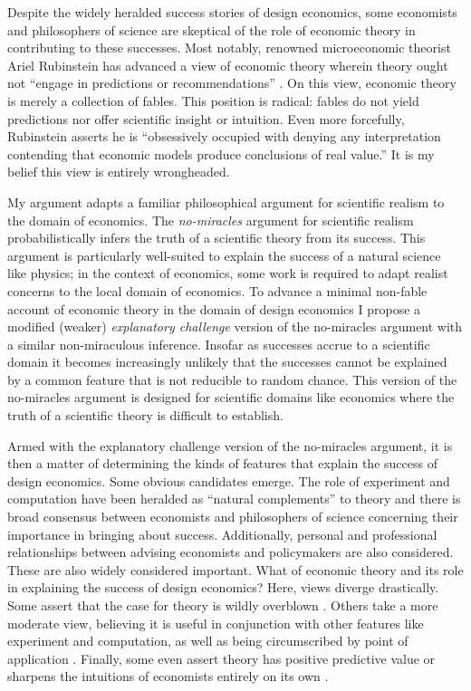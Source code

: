 Despite the widely heralded success stories of design economics, some economists and philosophers of science are skeptical of the role of economic theory in contributing to these successes. Most notably, renowned microeconomic theorist Ariel Rubinstein has advanced a view of economic theory wherein theory ought not ``engage in predictions or recommendations'' \autocite[36]{rubinstein2012}. On this view, economic theory is merely a collection of fables. This position is radical: fables do not yield predictions nor offer scientific insight or intuition. Even more forcefully, Rubinstein \autocite*[37]{rubinstein2012} asserts he is ``obsessively occupied with denying any interpretation contending that economic models produce conclusions of real value.'' It is my belief this view is entirely wrongheaded.

My argument adapts a familiar philosophical argument for scientific realism to the domain of economics. The \textit{no-miracles} argument for scientific realism \autocite{putnam1975} probabilistically infers the truth of a scientific theory from its success. This argument is particularly well-suited to explain the success of a natural science like physics; in the context of economics, some work is required to adapt realist concerns to the local domain of economics. To advance a minimal non-fable account of economic theory in the domain of design economics I propose a modified (weaker) \textit{explanatory challenge} version of the no-miracles argument with a similar non-miraculous inference. Insofar as successes accrue to a scientific domain it becomes increasingly unlikely that the successes cannot be explained by a common feature that is not reducible to random chance. This version of the no-miracles argument is designed for scientific domains like economics where the truth of a scientific theory is difficult to establish.

Armed with the explanatory challenge version of the no-miracles argument, it is then a matter of determining the kinds of features that explain the success of design economics. Some obvious candidates emerge. The role of experiment and computation have been heralded as ``natural complements'' \autocite[1342]{roth2002} to theory and there is broad consensus between economists and philosophers of science concerning their importance in bringing about success. Additionally, personal and professional relationships between advising economists and policymakers are also considered. These are also widely considered important. What of economic theory and its role in explaining the success of design economics? Here, views diverge drastically. Some assert that the case for theory is wildly overblown \autocite{nikkhah2008,rubinstein2012}. Others take a more moderate view, believing it is useful in conjunction with other features like experiment and computation, as well as being circumscribed by point of application \autocite{alexandrova2009}. Finally, some even assert theory has positive predictive value or sharpens the intuitions of economists entirely on its own \autocite{roth2019}. 

